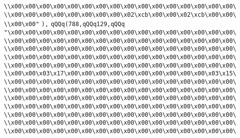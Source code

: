 \verb|\\x00\x00\x00\x00\x00\x00\x00\x00\x00\x00\x00\x00\x00\x00\x00\x00\|\newline
\verb|\\x00\x00\x00\x00\x00\x00\x00\x00\x02\xcb\x00\x00\x02\xcb\x00\x00\|\newline
\verb|\\x00\x00"|\newline
\verb|),|\newline
\verb|qQQq(788,qQQq129,qQQq|\newline
\verb|"\x00\x00\x00\x00\x00\x00\x00\x00\x00\x00\x00\x00\x00\x00\x00\x00\|\newline
\verb|\\x00\x00\x00\x00\x00\x00\x00\x00\x00\x00\x00\x00\x00\x00\x00\x00\|\newline
\verb|\\x00\x00\x00\x00\x00\x00\x00\x00\x00\x00\x00\x00\x00\x00\x00\x00\|\newline
\verb|\\x00\x00\x00\x00\x00\x00\x00\x00\x00\x00\x00\x00\x00\x00\x00\x00\|\newline
\verb|\\x00\x00\x00\x00\x00\x00\x00\x00\x00\x00\x00\x00\x00\x00\x00\x00\|\newline
\verb|\\x00\x00\x03\x17\x00\x00\x00\x00\x00\x00\x00\x00\x00\x00\x03\x15\|\newline
\verb|\\x00\x00\x00\x00\x00\x00\x00\x00\x00\x00\x00\x00\x00\x00\x00\x00\|\newline
\verb|\\x00\x00\x00\x00\x00\x00\x00\x00\x00\x00\x00\x00\x00\x00\x00\x00\|\newline
\verb|\\x00\x00\x00\x00\x00\x00\x00\x00\x00\x00\x00\x00\x00\x00\x00\x00\|\newline
\verb|\\x00\x00\x00\x00\x00\x00\x00\x00\x00\x00\x00\x00\x00\x00\x00\x00\|\newline
\verb|\\x00\x00\x00\x00\x00\x00\x00\x00\x00\x00\x00\x00\x00\x00\x00\x00\|\newline
\verb|\\x00\x00\x00\x00\x00\x00\x00\x00\x00\x00\x00\x00\x00\x00\x00\x00\|\newline
\verb|\\x00\x00\x00\x00\x00\x00\x00\x00\x00\x00\x00\x00\x00\x00\x00\x00\|\newline
